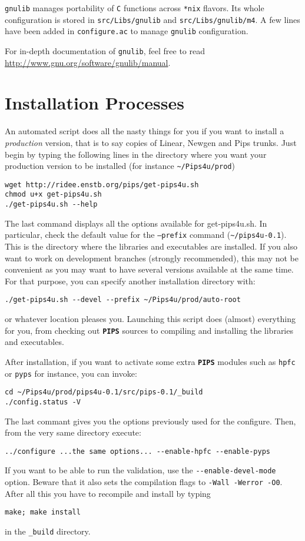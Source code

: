 \documentclass[a4paper]{article}
\newcommand{\PIPS}{\textbf{\texttt{PIPS}}}
\newcommand{\gnulib}{\texttt{gnulib}}
\newcommand{\file}[1]{\texttt{#1}}
\newcommand{\dir}[1]{\texttt{#1}}
\begin{document}
\gnulib{} manages portability of \texttt{C} functions across \texttt{*nix} flavors.
Its whole configuration is stored in \dir{src/Libs/gnulib} and \dir{src/Libs/gnulib/m4}.
A few lines have been added in \file{configure.ac} to manage \gnulib{} configuration.

For in-depth documentation of \gnulib{}, feel free to read \url{http://www.gnu.org/software/gnulib/manual}.

\section{Installation Processes}
\label{sec:install}

An automated script does all the nasty things for you if you want to
install a \emph{production} version, that is to say copies of Linear, Newgen
and Pips trunks. Just begin by typing the following lines in the
directory where you want your production version to be installed (for
instance \lstinline|~/Pips4u/prod|)
\begin{lstlisting}
wget http://ridee.enstb.org/pips/get-pips4u.sh
chmod u+x get-pips4u.sh
./get-pips4u.sh --help
\end{lstlisting}
The last command displays all the options available for
get-pips4u.sh. In particular, check the default value for the
\texttt{--prefix} command (\lstinline|~/pips4u-0.1|). This is the
directory where the libraries and executables are installed. If you
also want to work on development branches (strongly recommended), this
may not be convenient as you may want to have several versions
available at the same time. For that purpose, you can specify another
installation directory with:
\begin{lstlisting}
./get-pips4u.sh --devel --prefix ~/Pips4u/prod/auto-root
\end{lstlisting}
or whatever location pleases you. Launching this script does (almost)
everything for you, from checking out \PIPS{} sources to compiling and
installing the libraries and executables.

After installation, if you want to activate some extra \PIPS{} modules
such as \texttt{hpfc} or \texttt{pyps} for instance, you can invoke:
\begin{lstlisting}
cd ~/Pips4u/prod/pips4u-0.1/src/pips-0.1/_build
./config.status -V
\end{lstlisting}
The last commant gives you the options previously used for the
configure. Then, from the very same directory execute:
\begin{lstlisting}
../configure ...the same options... --enable-hpfc --enable-pyps
\end{lstlisting}
If you want to be able to run the validation, use the
\lstinline|--enable-devel-mode| option. Beware that it also sets the
compilation flags to \lstinline|-Wall -Werror -O0|.
After all this you have to recompile and install by typing
\begin{lstlisting}
make; make install
\end{lstlisting}
in the \lstinline|_build| directory.
\end{document}
